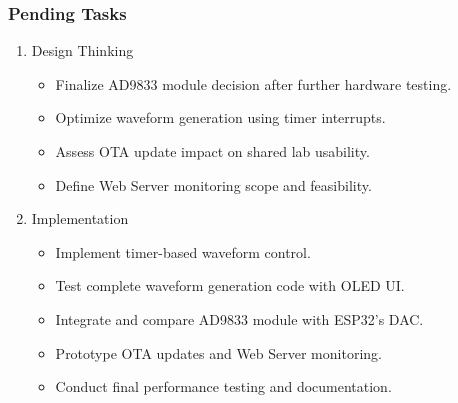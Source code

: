 \documentclass[12pt,a4paper]{article}
\begin{document}
\subsubsection*{Pending Tasks}
\begin{enumerate}
    \item Design Thinking
    \begin{itemize}
        \item Finalize AD9833 module decision after further hardware testing.
        \item Optimize waveform generation using timer interrupts.
        \item Assess OTA update impact on shared lab usability.
        \item Define Web Server monitoring scope and feasibility.
    \end{itemize}
    \item Implementation
    \begin{itemize}
        \item Implement timer-based waveform control.
        \item Test complete waveform generation code with OLED UI.
        \item Integrate and compare AD9833 module with ESP32’s DAC.
        \item Prototype OTA updates and Web Server monitoring.
        \item Conduct final performance testing and documentation.
    \end{itemize}
\end{enumerate}
\end{document}
